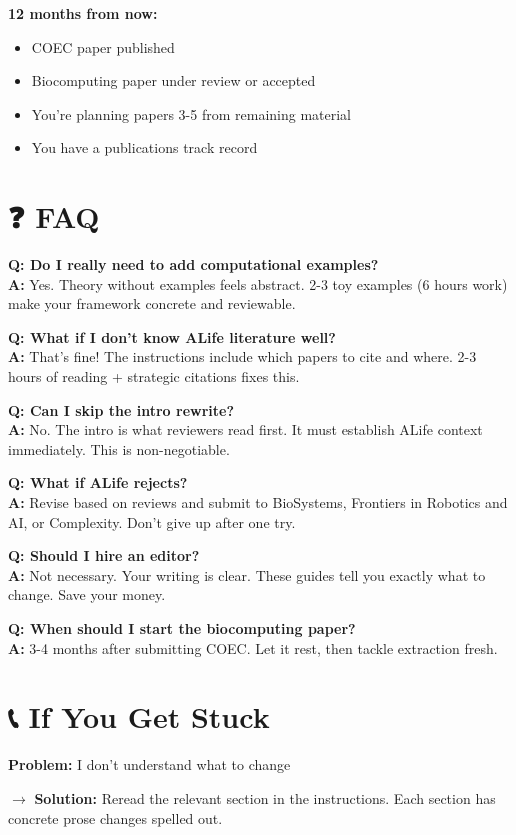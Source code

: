 \documentclass[11pt]{article}
\begin{document}
\textbf{12 months from now:}
\begin{itemize}
    \item COEC paper published
    \item Biocomputing paper under review or accepted
    \item You're planning papers 3-5 from remaining material
    \item You have a publications track record
\end{itemize}

\section*{❓ FAQ}

\textbf{Q: Do I really need to add computational examples?}\\
\textbf{A:} Yes. Theory without examples feels abstract. 2-3 toy examples (6 hours work) make your framework concrete and reviewable.

\textbf{Q: What if I don't know ALife literature well?}\\
\textbf{A:} That's fine! The instructions include which papers to cite and where. 2-3 hours of reading + strategic citations fixes this.

\textbf{Q: Can I skip the intro rewrite?}\\
\textbf{A:} No. The intro is what reviewers read first. It must establish ALife context immediately. This is non-negotiable.

\textbf{Q: What if ALife rejects?}\\
\textbf{A:} Revise based on reviews and submit to BioSystems, Frontiers in Robotics and AI, or Complexity. Don't give up after one try.

\textbf{Q: Should I hire an editor?}\\
\textbf{A:} Not necessary. Your writing is clear. These guides tell you exactly what to change. Save your money.

\textbf{Q: When should I start the biocomputing paper?}\\
\textbf{A:} 3-4 months after submitting COEC. Let it rest, then tackle extraction fresh.

\section*{📞 If You Get Stuck}

\textbf{Problem:} I don't understand what to change

$\rightarrow$ \textbf{Solution:} Reread the relevant section in the instructions. Each section has concrete prose changes spelled out.
\end{document}

